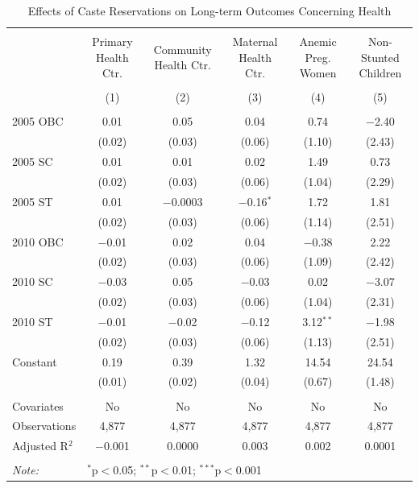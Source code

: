 \begin{table}
\centering
\begin{threeparttable}

  \caption{Effects of Caste Reservations on Long-term Outcomes Concerning Health} 
  \label{raj_caste_shrug_health_05_10} 
\scriptsize 
\begin{tabular}{@{\extracolsep{0pt}}lccccc} 
\\[-1.8ex]\hline 
\hline \\[-1.8ex] 
 & Primary Health Ctr. & Community Health Ctr. & Maternal Health Ctr. & Anemic Preg. Women & Non-Stunted Children \\ 
\\[-1.8ex] & (1) & (2) & (3) & (4) & (5)\\ 
\hline \\[-1.8ex] 
 2005 OBC & 0.01 & 0.05 & 0.04 & 0.74 & $-$2.40 \\ 
  & (0.02) & (0.03) & (0.06) & (1.10) & (2.43) \\ 
  2005 SC & 0.01 & 0.01 & 0.02 & 1.49 & 0.73 \\ 
  & (0.02) & (0.03) & (0.06) & (1.04) & (2.29) \\ 
  2005 ST & 0.01 & $-$0.0003 & $-$0.16$^{*}$ & 1.72 & 1.81 \\ 
  & (0.02) & (0.03) & (0.06) & (1.14) & (2.51) \\ 
  2010 OBC & $-$0.01 & 0.02 & 0.04 & $-$0.38 & 2.22 \\ 
  & (0.02) & (0.03) & (0.06) & (1.09) & (2.42) \\ 
  2010 SC & $-$0.03 & 0.05 & $-$0.03 & 0.02 & $-$3.07 \\ 
  & (0.02) & (0.03) & (0.06) & (1.04) & (2.31) \\ 
  2010 ST & $-$0.01 & $-$0.02 & $-$0.12 & 3.12$^{**}$ & $-$1.98 \\ 
  & (0.02) & (0.03) & (0.06) & (1.13) & (2.51) \\ 
  Constant & 0.19 & 0.39 & 1.32 & 14.54 & 24.54 \\ 
  & (0.01) & (0.02) & (0.04) & (0.67) & (1.48) \\ 
 \hline \\[-1.8ex] 
Covariates & No & No & No & No & No \\ 
Observations & 4,877 & 4,877 & 4,877 & 4,877 & 4,877 \\ 
Adjusted R$^{2}$ & $-$0.001 & 0.0000 & 0.003 & 0.002 & 0.0001 \\ 
\hline 
\hline \\[-1.8ex] 
\textit{Note:}  & \multicolumn{5}{l}{$^{*}$p$<$0.05; $^{**}$p$<$0.01; $^{***}$p$<$0.001} \\ 

\end{tabular}
\end{threeparttable}
\end{table}
